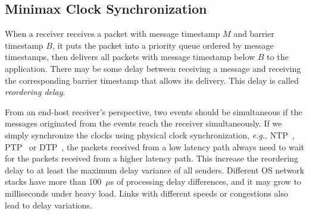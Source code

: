 
\subsection{Minimax Clock Synchronization}
\label{sec:sync}

When a receiver receives a packet with message timestamp $M$ and barrier timestamp $B$, it puts the packet into a priority queue ordered by message timestamps, then delivers all packets with message timestamp below $B$ to the application.
There may be some delay between receiving a message and receiving the corresponding barrier timestamp that allows its delivery. This delay is called \textit{reordering delay}.

From an end-host receiver's perspective, two events should be simultaneous if the messages originated from the events reach the receiver simultaneously.
If we simply synchronize the clocks using physical clock synchronization, \textit{e.g.}, NTP~\cite{mills1991internet}, PTP~\cite{correll2005design} or DTP~\cite{lee2016globally}, the packets received from a low latency path always need to wait for the packets received from a higher latency path. This increase the reordering delay to at least the maximum delay variance of all senders.
Different OS network stacks have more than 100~$\mu$s of processing delay differences, and it may grow to milliseconds under heavy load.
Links with different speeds or congestions also lead to delay variations.

